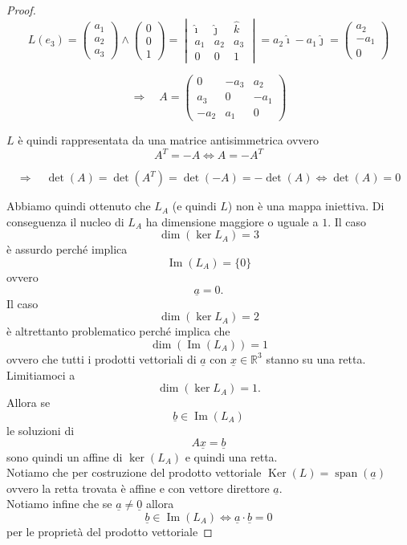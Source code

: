 \begin{proof}
\[
L(e_3)=
\begin{pmatrix}
a_1\\
a_2\\
a_3
\end{pmatrix}
\wedge
\begin{pmatrix}
0\\
0\\
1
\end{pmatrix}
=
\begin{vmatrix}
\hat{\imath} & \hat{\jmath} & \hat{k}\\
a_1 & a_2 & a_3\\
0 & 0 & 1
\end{vmatrix}
=
a_2\hat{\imath}-a_1\hat{\jmath}
=
\begin{pmatrix}
a_2\\
-a_1\\
0
\end{pmatrix}
\]

\[
\Rightarrow\quad
A=
\begin{pmatrix}
0 & -a_3 & a_2\\
a_3 & 0 & -a_1\\
-a_2 & a_1 & 0
\end{pmatrix}
\]

$L$ è quindi rappresentata da una matrice antisimmetrica ovvero
\[
A^T=-A
\iff
A=-A^T
\]

\[
\Rightarrow\quad
\det(A)=\det(A^T)=\det(-A)=-\det(A)
\iff
\det(A)=0
\]

Abbiamo quindi ottenuto che $L_A$ (e quindi $L$) non è una mappa iniettiva. Di conseguenza il nucleo di $L_A$ ha dimensione maggiore o uguale a $1$. Il caso
\[
\dim(\ker L_A)=3
\]
è assurdo perché implica
\[
\operatorname{Im}(L_A)=\{0\}
\]
ovvero
\[
\underline{a}=0.
\]
Il caso
\[
\dim(\ker L_A)=2
\]
è altrettanto problematico perché implica che
\[
\dim(\operatorname{Im}(L_A))=1
\]
ovvero che tutti i prodotti vettoriali di $\underline{a}$ con $\underline{x}\in\mathbb{R}^3$ stanno su una retta. Limitiamoci a
\[
\dim(\ker L_A)=1.
\]
Allora se
\[
\underline{b}\in\operatorname{Im}(L_A)
\]
le soluzioni di
\[
A\underline{x}=\underline{b}
\]
sono quindi un affine di $\ker(L_A)$ e quindi una retta.\\
Notiamo che per costruzione del prodotto vettoriale $\operatorname{Ker}(L) = \operatorname{span}(\underline{a})$ ovvero la  retta trovata è affine e con vettore direttore $\underline{a}$.\\
Notiamo infine che se $\underline{a} \ne \underline{0}$ allora
\[
\underline{b} \in \operatorname{Im}(L_A) \Leftrightarrow \underline{a} \cdot \underline{b} = 0
\]
per le proprietà del prodotto vettoriale
\end{proof}
